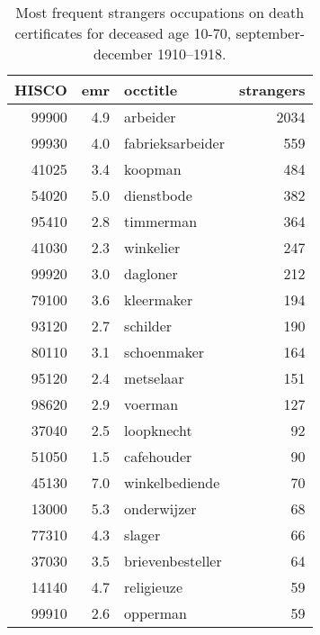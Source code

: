 \begin{table}

\caption{\label{tab:tab:topstrangers}Most frequent strangers occupations on death certificates for deceased age 10-70, september-december 1910–1918.}
\centering
\begin{tabular}[t]{r|r|l|r}
\hline
HISCO & emr & occtitle & strangers\\
\hline
99900 & 4.9 & arbeider & 2034\\
\hline
99930 & 4.0 & fabrieksarbeider & 559\\
\hline
41025 & 3.4 & koopman & 484\\
\hline
54020 & 5.0 & dienstbode & 382\\
\hline
95410 & 2.8 & timmerman & 364\\
\hline
41030 & 2.3 & winkelier & 247\\
\hline
99920 & 3.0 & dagloner & 212\\
\hline
79100 & 3.6 & kleermaker & 194\\
\hline
93120 & 2.7 & schilder & 190\\
\hline
80110 & 3.1 & schoenmaker & 164\\
\hline
95120 & 2.4 & metselaar & 151\\
\hline
98620 & 2.9 & voerman & 127\\
\hline
37040 & 2.5 & loopknecht & 92\\
\hline
51050 & 1.5 & cafehouder & 90\\
\hline
45130 & 7.0 & winkelbediende & 70\\
\hline
13000 & 5.3 & onderwijzer & 68\\
\hline
77310 & 4.3 & slager & 66\\
\hline
37030 & 3.5 & brievenbesteller & 64\\
\hline
14140 & 4.7 & religieuze & 59\\
\hline
99910 & 2.6 & opperman & 59\\
\hline
\end{tabular}
\end{table}
